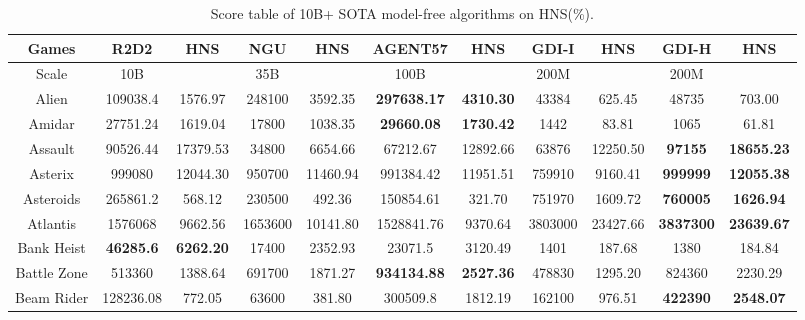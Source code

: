 \documentclass[nohyperref]{article}
\theoremstyle{plain}
\begin{document}
\begin{table}[!hb]
\footnotesize
\begin{center}
\caption{Score table of 10B+ SOTA  model-free algorithms on HNS(\%).}
\label{Tab:Score table of SOTA  model-free algorithms on HNS.}
\setlength{\tabcolsep}{1.0pt}
\begin{tabular}{| c| c c| c c| c c| c c| c c|}
\hline
 Games & R2D2 & HNS & NGU & HNS & AGENT57 & HNS & GDI-I & HNS & GDI-H & HNS \\
\hline
Scale  & 10B   &        & 35B &         & 100B     &        & 200M &     &  200M   &\\
\hline
 Alien  & 109038.4 & 1576.97 & 248100 & 3592.35 & \textbf{297638.17} & \textbf{4310.30}             &43384             &625.45                &48735             &703.00       \\
 Amidar & 27751.24 & 1619.04 & 17800  & 1038.35 & \textbf{29660.08}  & \textbf{1730.42}             &1442              &83.81                 &1065              &61.81        \\
 Assault &  90526.44 & 17379.53 & 34800 & 6654.66 & 67212.67 & 12892.66            &63876           &12250.50          &\textbf{97155}        &\textbf{18655.23}     \\
 Asterix &  999080   & 12044.30 & 950700 & 11460.94 & 991384.42 & 11951.51         &759910          &9160.41           &\textbf{999999}       &\textbf{12055.38}     \\
 Asteroids & 265861.2 & 568.12 & 230500 & 492.36   & 150854.61 & 321.70                             &751970            &1609.72               &\textbf{760005}            &\textbf{1626.94}      \\
 Atlantis & 1576068   & 9662.56 & 1653600 & 10141.80 & 1528841.76 & 9370.64                         &3803000           &23427.66              &\textbf{3837300}           &\textbf{23639.67}     \\
 Bank Heist & \textbf{46285.6} & \textbf{6262.20} & 17400   & 2352.93  & 23071.5& 3120.49           &1401              &187.68                &1380              &184.84       \\
 Battle Zone & 513360 & 1388.64 & 691700  & 1871.27  & \textbf{934134.88}& \textbf{2527.36}         &478830            &1295.20               &824360            &2230.29      \\
 Beam Rider & 128236.08 & 772.05 & 63600  & 381.80   & 300509.8 & 1812.19         &162100            &976.51                &\textbf{422390}            &\textbf{2548.07}      \\

\end{tabular}
\end{center}
\end{table}
\end{document}
